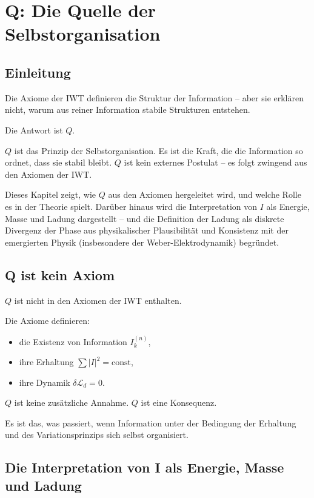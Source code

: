 \chapter{Q: Die Quelle der Selbstorganisation}

\section{Einleitung}

Die Axiome der IWT definieren die Struktur der Information – aber sie erklären nicht, warum aus reiner Information stabile Strukturen entstehen.

Die Antwort ist \( Q \).

\( Q \) ist das Prinzip der Selbstorganisation. Es ist die Kraft, die die Information so ordnet, dass sie stabil bleibt. \( Q \) ist kein externes Postulat – es folgt zwingend aus den Axiomen der IWT.

Dieses Kapitel zeigt, wie \( Q \) aus den Axiomen hergeleitet wird, und welche Rolle es in der Theorie spielt. Darüber hinaus wird die Interpretation von \( I \) als Energie, Masse und Ladung dargestellt – und die Definition der Ladung als diskrete Divergenz der Phase aus physikalischer Plausibilität und Konsistenz mit der emergierten Physik (insbesondere der Weber-Elektrodynamik) begründet.

\section{Q ist kein Axiom}

\( Q \) ist nicht in den Axiomen der IWT enthalten.

Die Axiome definieren:
\begin{itemize}
\item die Existenz von Information \( I_k^{(n)} \),
\item ihre Erhaltung \( \sum |I|^2 = \text{const} \),
\item ihre Dynamik \( \delta \mathcal{L}_d = 0 \).
\end{itemize}

\( Q \) ist keine zusätzliche Annahme. \( Q \) ist eine Konsequenz.

Es ist das, was passiert, wenn Information unter der Bedingung der Erhaltung und des Variationsprinzips sich selbst organisiert.

\section{Die Interpretation von I als Energie, Masse und Ladung}

